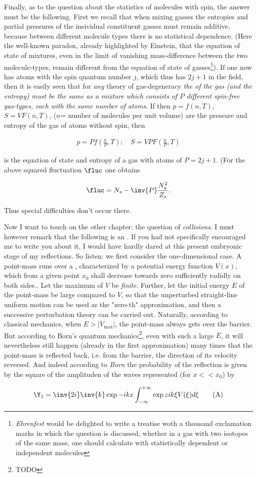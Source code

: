 \documentclass{article}
\newcommand{\nequ}[2]{
\begin{align*}
#1
\tag{#2}
\end{align*}
}
\newcommand{\uequ}[1]{
\begin{align*}
#1
\end{align*}
}
\begin{document}
Finally, as to the question about the statistics of molecules with spin, the answer must be the following. First we recall that when mixing gasses the entropies and partial pressures of the insividual constituent gasses must remain additive, because between different molecule types there is no statistical dependence. (Here the well-known paradox, already highlighted by Einstein, that the equation of state of mixtures, even in the limit of vanishing mass-difference between the two molecule-types, remain different from the equation of state of  gasses\footnote{\textit{Ehrenfest} would be delighted to write a treatise woth a thousand exclamation marks in which the question is discussed, whether in a gas with two isotopes of the same mass, one should calculate with statistically dependent or independent molecules}). If one now has atoms with the spin quantum number $j$, which thus has $2j+1$  in the field, then it is easily seen that for \textit{any} theory of gas-degeneracy \textit{the  of the gas (and the entropy) must be the same as a mixture which consists of $P$ different spin-free gas-types, each with the same number of atoms}. If then $p=f(n,T)$,$S=VF(n,T)$, ($n$= number of molecules per unit volume) are the pressure and entropy of the gas of atoms without spin, then
\uequ{
p=Pf\left(\frac{n}{P},T\right);\quad S=VPF\left(\frac{n}{P},T\right)
}
is the equation of state and entropy of a gas with atoms of  $P=2j+1$. (For the above squared fluctuation $\fluc$ one obtains
\uequ{
\fluc = N_s - \inv{P}\frac{N_s^2}{Z_s}.
}
Thus special difficulties don't occur there.

Now I want to touch on the other chapter: the question of \textit{collisions}. I must however remark that the following is an . If you had not specifically encouraged me to write you about it, I would have hardly dared at this present embryonic stage of my reflections. So listen: we first consider the one-dimensional case. A point-mass runs over a , characterized by a potential energy function $V(x)$, which from a given point $x_0$ shall decrease towards zero sufficiently radidly on both sides.. Let the maximum of $V$ be \textit{finite}. Further, let the initial energy $E$ of the point-mass be large compared to $V$, so that the unperturbed straight-line uniform motion can be used as the "zero-th" approximation, and then a successive perturbation theory can be carried out. Naturally, according to classical mechanics, when $E>|V_\text{max}|$, the point-mass always gets over the barrier. But according to Born's quantum mechanics\footnote{TODO}, even with such a large $E$, it will nevertheless still happen (already in the first approximation) many times that the point-mass is reflected back, i.e. from the barrier, the direction of its velocity reversed. And indeed according to \textit{Born} the  probability of the reflection is given by the square of the amplituden of the waves represented (for $x<<x_0$) by
\nequ{
\Y_1 = \inv{2i}\inv{k}\exp{-ikx}\int^{+\infty}_{-\infty}\exp{zik\xi}V(\xi)d\xi
}{A}
\end{document}
